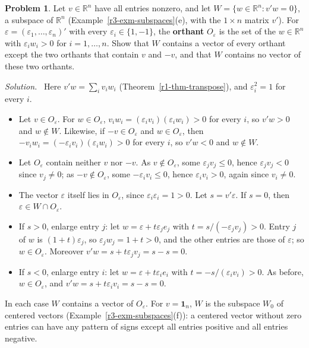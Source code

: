 \documentclass[12pt]{article}
\newcommand{\R}{\mathbb R}
\newcommand{\one}{\mathbf 1}
\theoremstyle{definition}
\newtheorem{problem}{Problem}
\newenvironment{solution}{\par\noindent\textit{Solution.}\ }{\par\smallskip}
\begin{document}
\begin{problem}\label{r3-ex-pr-orthants}
Let \(v\in\R^n\) have all entries nonzero, and let \(W=\{w\in\R^n:v'w=0\}\), a subspace of \(\R^n\)
(Example~\ref{r3-exm-subspaces}(e), with the \(1\times n\) matrix \(v'\)). For
\(\varepsilon=(\varepsilon_1,\dots,\varepsilon_n)'\) with every \(\varepsilon_i\in\{1,-1\}\), the \textbf{orthant}
\(O_\varepsilon\) is the set of the \(w\in\R^n\) with \(\varepsilon_iw_i>0\) for \(i=1,\dots,n\). Show that \(W\)
contains a vector of every orthant except the two orthants that contain \(v\) and \(-v\), and that \(W\) contains no
vector of these two orthants.
\end{problem}
\begin{solution}
Here \(v'w=\sum_iv_iw_i\) (Theorem~\ref{r1-thm-transpose}), and \(\varepsilon_i^2=1\) for every \(i\).
\begin{itemize}
\item Let \(v\in O_\varepsilon\). For \(w\in O_\varepsilon\), \(v_iw_i=(\varepsilon_iv_i)(\varepsilon_iw_i)>0\) for
every \(i\), so \(v'w>0\) and \(w\notin W\). Likewise, if \(-v\in O_\varepsilon\) and \(w\in O_\varepsilon\), then
\(-v_iw_i=(-\varepsilon_iv_i)(\varepsilon_iw_i)>0\) for every \(i\), so \(v'w<0\) and \(w\notin W\).
\item Let \(O_\varepsilon\) contain neither \(v\) nor \(-v\). As \(v\notin O_\varepsilon\), some
\(\varepsilon_jv_j\leqslant0\), hence \(\varepsilon_jv_j<0\) since \(v_j\ne0\); as \(-v\notin O_\varepsilon\), some
\(-\varepsilon_iv_i\leqslant0\), hence \(\varepsilon_iv_i>0\), again since \(v_i\ne0\).
\item The vector \(\varepsilon\) itself lies in \(O_\varepsilon\), since \(\varepsilon_i\varepsilon_i=1>0\). Let
\(s=v'\varepsilon\). If \(s=0\), then \(\varepsilon\in W\cap O_\varepsilon\).
\item If \(s>0\), enlarge entry \(j\): let \(w=\varepsilon+t\varepsilon_je_j\) with \(t=s/(-\varepsilon_jv_j)>0\). Entry
\(j\) of \(w\) is \((1+t)\varepsilon_j\), so \(\varepsilon_jw_j=1+t>0\), and the other entries are those of
\(\varepsilon\); so \(w\in O_\varepsilon\). Moreover \(v'w=s+t\varepsilon_jv_j=s-s=0\).
\item If \(s<0\), enlarge entry \(i\): let \(w=\varepsilon+t\varepsilon_ie_i\) with \(t=-s/(\varepsilon_iv_i)>0\). As
before, \(w\in O_\varepsilon\), and \(v'w=s+t\varepsilon_iv_i=s-s=0\).
\end{itemize}
In each case \(W\) contains a vector of \(O_\varepsilon\). For \(v=\one_n\), \(W\) is the subspace \(W_0\) of centered
vectors (Example~\ref{r3-exm-subspaces}(f)): a centered vector without zero entries can have any pattern of signs except
all entries positive and all entries negative.
\end{solution}
\end{document}
